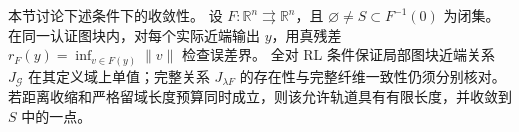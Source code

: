 \documentclass{ctexart}
\begin{document}
本节讨论下述条件下的收敛性。
设 $F:\mathbb R^n\rightrightarrows\mathbb R^n$，且 $\varnothing\ne S\subset F^{-1}(0)$ 为闭集。
在同一认证图块内，对每个实际近端输出 $y$，用真残差 $r_F(y)=\inf_{v\in F(y)}\|v\|$ 检查误差界。
全对 RL 条件保证局部图块近端关系 $J_{\mathcal G}$ 在其定义域上单值；完整关系 $J_{\lambda F}$ 的存在性与完整纤维一致性仍须分别核对。
若距离收缩和严格留域长度预算同时成立，则该允许轨道具有有限长度，并收敛到 $S$ 中的一点。
\end{document}
